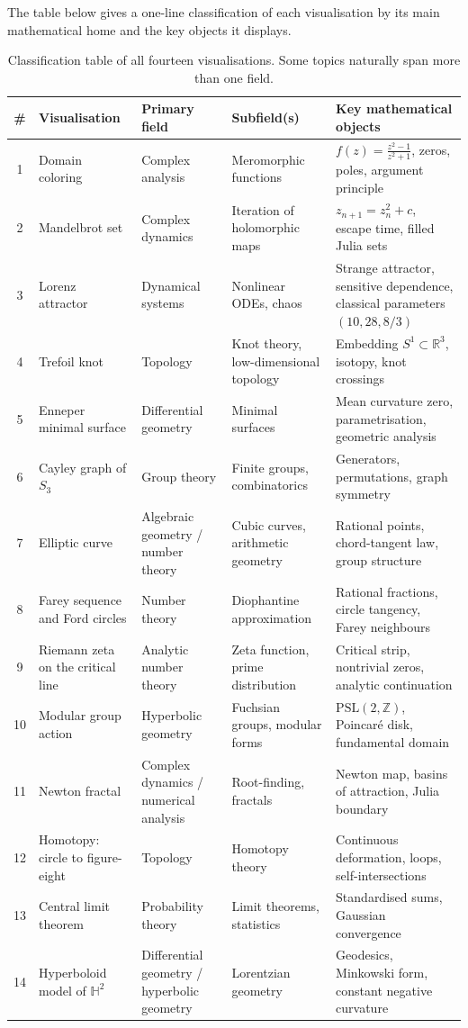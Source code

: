 \documentclass[11pt,a4paper]{article}
\begin{document}
The table below gives a one-line classification of each visualisation by its main mathematical home and the key objects it displays.

\begin{table}[H]
\centering
\small
\begin{tabularx}{\textwidth}{@{}c P{2.9cm} P{2.8cm} P{3.0cm} Y@{}}
\toprule
\# & Visualisation & Primary field & Subfield(s) & Key mathematical objects \\
 & Domain coloring & Complex analysis & Meromorphic functions & \(f(z)=\frac{z^2-1}{z^2+1}\), zeros, poles, argument principle \\
2 & Mandelbrot set & Complex dynamics & Iteration of holomorphic maps & \(z_{n+1}=z_n^2+c\), escape time, filled Julia sets \\
3 & Lorenz attractor & Dynamical systems & Nonlinear ODEs, chaos & Strange attractor, sensitive dependence, classical parameters \((10,28,8/3)\) \\
4 & Trefoil knot & Topology & Knot theory, low-dimensional topology & Embedding \(S^1\subset\mathbb{R}^3\), isotopy, knot crossings \\
5 & Enneper minimal surface & Differential geometry & Minimal surfaces & Mean curvature zero, parametrisation, geometric analysis \\
6 & Cayley graph of \(S_3\) & Group theory & Finite groups, combinatorics & Generators, permutations, graph symmetry \\
7 & Elliptic curve & Algebraic geometry / number theory & Cubic curves, arithmetic geometry & Rational points, chord-tangent law, group structure \\
8 & Farey sequence and Ford circles & Number theory & Diophantine approximation & Rational fractions, circle tangency, Farey neighbours \\
9 & Riemann zeta on the critical line & Analytic number theory & Zeta function, prime distribution & Critical strip, nontrivial zeros, analytic continuation \\
10 & Modular group action & Hyperbolic geometry & Fuchsian groups, modular forms & \(\mathrm{PSL}(2,\mathbb{Z})\), Poincar\'e disk, fundamental domain \\
11 & Newton fractal & Complex dynamics / numerical analysis & Root-finding, fractals & Newton map, basins of attraction, Julia boundary \\
12 & Homotopy: circle to figure-eight & Topology & Homotopy theory & Continuous deformation, loops, self-intersections \\
13 & Central limit theorem & Probability theory & Limit theorems, statistics & Standardised sums, Gaussian convergence \\
14 & Hyperboloid model of \(\mathbb{H}^2\) & Differential geometry / hyperbolic geometry & Lorentzian geometry & Geodesics, Minkowski form, constant negative curvature \\
\bottomrule
\end{tabularx}
\caption{Classification table of all fourteen visualisations. Some topics naturally span more than one field.}
\label{tab:classification}
\end{table}
\end{document}
